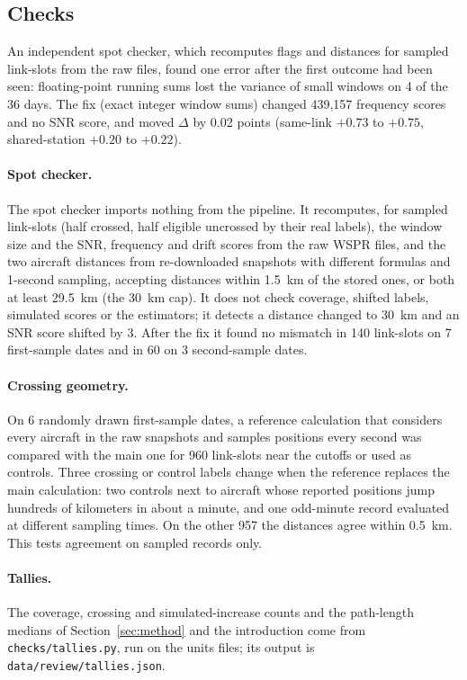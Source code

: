 \documentclass[11pt]{article}
\begin{document}
\begin{appendices}
\section{Checks}\label{app:checks}
An independent spot checker, which recomputes flags and distances for sampled link-slots from the raw files, found one error after the first outcome had been seen: floating-point running sums lost the variance of small windows on 4 of the 36 days. The fix (exact integer window sums) changed 439{,}157 frequency scores and no SNR score, and moved $\Delta$ by 0.02 points (same-link $+0.73$ to $+0.75$, shared-station $+0.20$ to $+0.22$).

\paragraph{Spot checker.} The spot checker imports nothing from the pipeline. It recomputes, for sampled link-slots (half crossed, half eligible uncrossed by their real labels), the window size and the SNR, frequency and drift scores from the raw WSPR files, and the two aircraft distances from re-downloaded snapshots with different formulas and 1-second sampling, accepting distances within 1.5~km of the stored ones, or both at least 29.5~km (the 30~km cap). It does not check coverage, shifted labels, simulated scores or the estimators; it detects a distance changed to 30~km and an SNR score shifted by 3. After the fix it found no mismatch in 140 link-slots on 7 first-sample dates and in 60 on 3 second-sample dates.

\paragraph{Crossing geometry.} On 6 randomly drawn first-sample dates, a reference calculation that considers every aircraft in the raw snapshots and samples positions every second was compared with the main one for 960 link-slots near the cutoffs or used as controls. Three crossing or control labels change when the reference replaces the main calculation: two controls next to aircraft whose reported positions jump hundreds of kilometers in about a minute, and one odd-minute record evaluated at different sampling times. On the other 957 the distances agree within 0.5~km. This tests agreement on sampled records only.

\paragraph{Tallies.} The coverage, crossing and simulated-increase counts and the path-length medians of Section~\ref{sec:method} and the introduction come from \texttt{checks/tallies.py}, run on the units files; its output is \texttt{data/review/tallies.json}.


\end{appendices}
\end{document}
